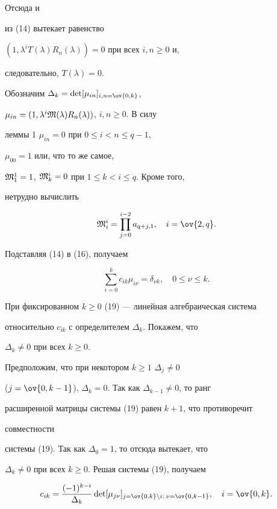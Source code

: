 Отсюда и 


из (14) вытекает равенство 


$(1,\lambda^i T(\lambda)R_n(\lambda))=0$ при всех $i,n\ge 0$ и, 


следовательно, $T(\lambda)=0$. 


 


Обозначим $\Delta_k=\det[\mu_{in}]_{i,n=\ov{0,k}}$, 


$\mu_{in}=(1,\lambda^i\frak M(\lambda)R_n(\lambda))$, $i,n\ge 0$. В силу 


леммы 1\; $\mu_{in}=0$ при $0\le i<n\le q-1$, 


$\mu_{00}=1$ или, что то же самое, 


$\frak M^1_1=1$, $\frak M^i_k=0$ при $1\le k<i\le q$. Кроме того, 


нетрудно вычислить 


$$ 


\frak M^i_i=\prod^{i-2}_{j=0}a_{q+j,1},\quad i=\ov{2,q}. 


$$ 


 


Подставляя (14) в (16), получаем 


\begin{equation} 


\sum^k_{i=0}c_{ik}\mu_{i\nu}=\delta_{\nu k},\quad 


0\le\nu\le k. 


\end{equation} 


При фиксированном $k\ge 0$\; (19) --- линейная алгебраическая система 


относительно $c_{ik}$ с определителем $\Delta_k$. Покажем, что 


$\Delta_k\ne 0$ при всех $k\ge 0$. 


Предположим, что при некотором $k\ge 1$\; $\Delta_j\ne 0$ 


($j=\ov{0,k-1}$), $\Delta_k=0$. Так как $\Delta_{k-1}\ne 0$, то ранг 


расширенной матрицы системы (19) равен $k+1$, что противоречит 


совместности 


системы (19). Так как $\Delta_0=1$, то отсюда вытекает, что 


$\Delta_k\ne 0$ при всех $k\ge 0$. Решая системы (19), получаем 


\begin{equation} 


c_{ik}=\frac{(-1)^{k-i}}{\Delta_k} 


\det[\mu_{j\nu}]_{j=\ov{0,k}\setminus i;\;\nu=\ov{0,k-1}},\quad 


i=\ov{0,k}. 


\end{equation} 


